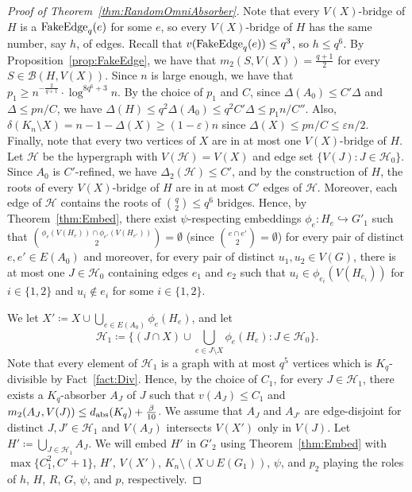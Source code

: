 \documentclass[11pt]{article}
\numberwithin{equation}{section}
\newcommand{\eps}{\varepsilon}
\newcounter{i}
\theoremstyle{plain}
\theoremstyle{plain} %
\theoremstyle{definition}
\newcommand{\cB}{\mathcal{B}}
\newcommand{\cH}{\mathcal{H}}
\begin{document}
\begin{proof}[Proof of Theorem~\ref{thm:RandomOmniAbsorber}]
Note that every $V(X)$-bridge of $H$ is a ${\rm FakeEdge}_q(e)$ for some $e$, so every $V(X)$-bridge of $H$ has the same number, say $h$, of edges.  Recall that $v({\rm FakeEdge}_q(e))\le q^3$, so $h \leq q^6$.  By Proposition~\ref{prop:FakeEdge}, we have that $m_2(S, V(X)) = \frac{q+1}{2}$ for every $S \in \cB(H, V(X))$.  
Since $n$ is large enough, we have that $p_1 \geq n^{-\frac{2}{q+1}} \cdot 
\log^{8q^{6}+3} n$.  
By the choice of $p_1$ and $C$, since $\Delta(A_0) \leq C'\Delta$ and $\Delta \leq pn / C$, we have $\Delta(H) \leq q^2 \Delta(A_0) \leq q^2 C'\Delta \leq p_1n/C''$.
Also, $\delta(K_n \setminus X) = n - 1 - \Delta(X) \geq (1 - \eps)n$ since $\Delta(X) \leq pn / C \leq \eps n / 2$. Finally, note that every two vertices of $X$ are in at most one $V(X)$-bridge of $H$.
Let $\cH$ be the hypergraph with $V(\cH) = V(X)$ and edge set $\{V(J) : J \in \cH_0\}$.  Since $A_0$ is $C'$-refined, we have $\Delta_2(\cH) \leq C'$, and by the construction of $H$, the roots of every $V(X)$-bridge of $H$ are in at most $C'$ edges of $\cH$.  Moreover, each edge of $\cH$ contains the roots of $\binom{q}{2} \leq q^6$ bridges.  
Hence, 
by Theorem~\ref{thm:Embed}, there exist $\psi$-respecting embeddings $\phi_e : H_e \hookrightarrow G'_1$ such that $\binom{\phi_e(V(H_e)) \cap \phi_{e'}(V(H_{e'}))}{2} = \emptyset$ (since $\binom{e \cap e'}{2} = \emptyset$) for every pair of distinct $e, e' \in E(A_0)$ and moreover, for every pair of distinct $u_1, u_2 \in V(G)$, there is at most one $J \in \cH_0$ containing edges $e_1$ and $e_2$ such that $u_i \in \phi_{e_i}(V(H_{e_i}))$ for $i \in \{1,2\}$ and $u_i \notin e_i$ for some $i \in \{1,2\}$.

We let $X'\coloneqq X\cup \bigcup_{e\in E(A_0)}\phi_e(H_e)$, and let
$$\mathcal{H}_1 \coloneqq \Bigg\{ (J\cap X) \cup \bigcup_{e\in J\setminus X} \phi_e(H_e) : J\in \mathcal{H}_0\Bigg\}.$$
Note that every element of $\mathcal{H}_1$ is a graph with at most $q^5$ vertices which is $K_q$-divisible by Fact~\ref{fact:Div}. 
Hence, by the choice of $C_1$, for every $J\in \mathcal{H}_1$, there exists a $K_q$-absorber $A_J$ of $J$ such that $v(A_J)\le C_1$ and $m_2(A_J,V(J)) \le d_{{\rm abs}}(K_q)+\frac{\beta}{10}$.  We assume that $A_J$ and $A_{J'}$ are edge-disjoint for distinct $J, J' \in \cH_1$ and $V(A_J)$ intersects $V(X')$ only in $V(J)$.  Let $H' \coloneqq \bigcup_{J\in\cH_1}A_J$.
We will embed $H'$ in $G'_2$ using Theorem~\ref{thm:Embed} with $\max\{C_1^2, C'+1\}$, $H'$, $V(X')$, $K_n \setminus (X \cup E(G_1))$, $\psi$, and $p_2$ playing the roles of $h$, $H$, $R$, $G$, $\psi$, and $p$, respectively.


\end{proof}
\end{document}

